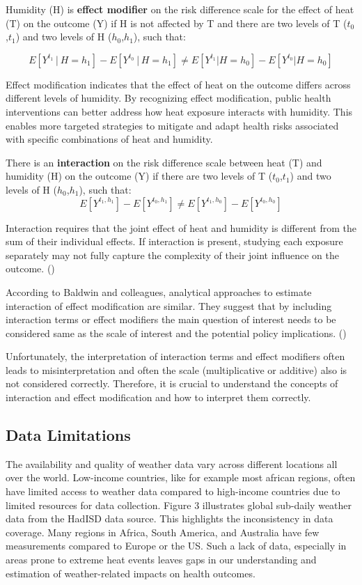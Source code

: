 \documentclass[
]{krantz}
\begin{document}
Humidity (H) is \textbf{effect modifier} on the risk difference scale for the effect of heat (T) on the outcome (Y) if H is not affected by T and there are two levels of T (\(t_0\),\(t_1\)) and two levels of H (\(h_0\),\(h_1\)), such that:

\[
Ε[Y^{t_1}│H=h_1] - E[Y^{t_0}│H=h_1] ≠ E[Y^{t_1}|H=h_0]- E[Y^{t_0}|H=h_0]
\]

Effect modification indicates that the effect of heat on the outcome differs across different levels of humidity. By recognizing effect modification, public health interventions can better address how heat exposure interacts with humidity. This enables more targeted strategies to mitigate and adapt health risks associated with specific combinations of heat and humidity.

There is an \textbf{interaction} on the risk difference scale between heat (T) and humidity (H) on the outcome (Y) if there are two levels of T (\(t_0\),\(t_1\)) and two levels of H (\(h_0\),\(h_1\)), such that:
\[
Ε[Y^{t_1, h_1}] - E[Y^{t_0, h_1}] ≠ E[Y^{t_1, h_0}]- E[Y^{t_0, h_0}]
\]

Interaction requires that the joint effect of heat and humidity is different from the sum of their individual effects. If interaction is present, studying each exposure separately may not fully capture the complexity of their joint influence on the outcome. (\citet{vanderweele})

According to Baldwin and colleagues, analytical approaches to estimate interaction of effect modification are similar. They suggest that by including interaction terms or effect modifiers the main question of interest needs to be considered same as the scale of interest and the potential policy implications. (\citet{bald})

Unfortunately, the interpretation of interaction terms and effect modifiers often leads to misinterpretation and often the scale (multiplicative or additive) also is not considered correctly. Therefore, it is crucial to understand the concepts of interaction and effect modification and how to interpret them correctly.

\subsection{Data Limitations}\label{data-limitations}

The availability and quality of weather data vary across different locations all over the world. Low-income countries, like for example most african regions, often have limited access to weather data compared to high-income countries due to limited resources for data collection. Figure 3 illustrates global sub-daily weather data from the HadISD data source. This highlights the inconsistency in data coverage. Many regions in Africa, South America, and Australia have few measurements compared to Europe or the US. Such a lack of data, especially in areas prone to extreme heat events leaves gaps in our understanding and estimation of weather-related impacts on health outcomes.
\end{document}
